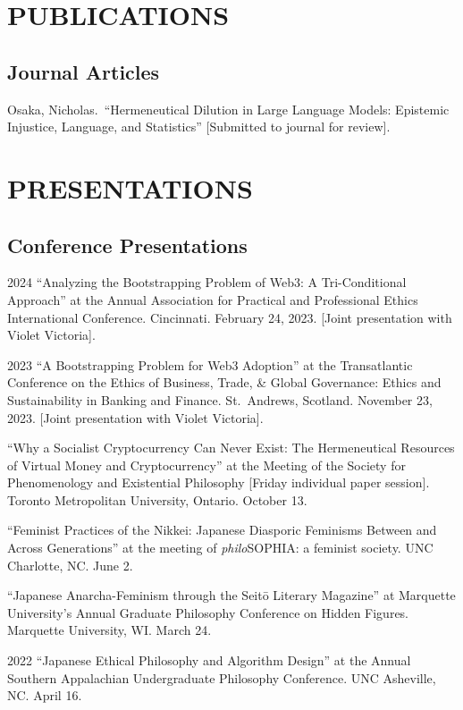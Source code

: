 \documentclass{article}
\begin{document}
\section*{\normalsize{PUBLICATIONS}}
\subsection*{\normalsize{Journal Articles}}
\begin{tablist}
    \item[] \tab{}Osaka, Nicholas.~\enquote{Hermeneutical Dilution in Large Language Models: Epistemic Injustice, Language, and Statistics} [Submitted to journal for review].
\end{tablist}

\section*{\normalsize{PRESENTATIONS}}
\subsection*{\normalsize{Conference Presentations}}
\begin{tablist}
    \item[2024] \tab{}\enquote{Analyzing the Bootstrapping Problem of Web3: A Tri-Conditional Approach} at the  Annual Association for Practical and Professional Ethics International Conference. Cincinnati. February 24, 2023. [Joint presentation with Violet Victoria].
    \item[2023] \tab{}\enquote{A Bootstrapping Problem for Web3 Adoption} at the  Transatlantic Conference on the Ethics of Business, Trade, \& Global Governance: Ethics and Sustainability in Banking and Finance. St.~Andrews, Scotland. November 23, 2023. [Joint presentation with Violet Victoria].
    \item[] \tab{}\enquote{Why a Socialist Cryptocurrency Can Never Exist: The Hermeneutical Resources of Virtual Money and Cryptocurrency} at the  Meeting of the Society for Phenomenology and Existential Philosophy [Friday individual paper session]. Toronto Metropolitan University, Ontario. October 13.
    \item[] \tab{}\enquote{Feminist Practices of the Nikkei: Japanese Diasporic Feminisms Between and Across Generations} at the  meeting of \textit{philo}SOPHIA: a feminist society. UNC Charlotte, NC. June 2.
    \item[] \tab{}\enquote{Japanese Anarcha-Feminism through the Seitō Literary Magazine} at Marquette University's Annual Graduate Philosophy Conference on Hidden Figures. Marquette University, WI. March 24.
    \item[2022] \tab{}\enquote{Japanese Ethical Philosophy and Algorithm Design} at the  Annual Southern Appalachian Undergraduate Philosophy Conference. UNC Asheville, NC. April 16.
\end{tablist}
\end{document}
